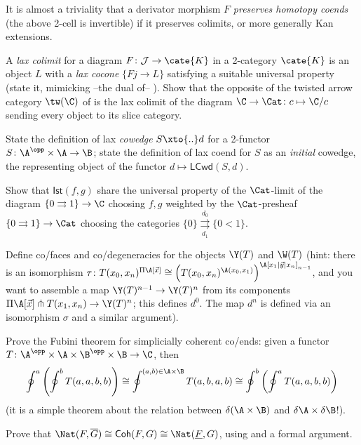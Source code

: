It is almost a triviality that a derivator morphism $F$ \emph{preserves homotopy coends} (\ie the above 2-cell is invertible) if it preserves colimits, or more generally Kan extensions.
\begin{exerciseset}
\begin{exercisepoints}
\item \label{ex8:tw-as-a-laxlim} A \emph{lax colimit} for a diagram $F \colon \mathcal{J}\to \cate{K}$ in a 2-category $\cate{K}$ is an object $L$ with a \emph{lax cocone} $\{Fj \to L\}$ satisfying a suitable universal property (state it, mimicking --the dual of-- \adef{}). Show that the opposite of the twisted arrow category $\tw(\C)$ of \adef{} is the lax colimit of the diagram $\C \to \Cat \colon c \mapsto \C/c$ sending every object to its slice category.
\item \label{ex8:laxcoends} State the definition of lax \emph{cowedge} $S\xto{..}d$ for a 2-functor $S\colon \A^\opp\times \A\to \B$; state the definition of lax coend for $S$ as an \emph{initial} cowedge, the representing object of the functor $d\mapsto \textsf{LCwd}(S,d)$. 
\item \label{ex8:inserter} Show that $\textsf{Ist}(f,g)$ share the universal property of the $\Cat$-limit of the diagram $\{0\rightrightarrows 1\} \to \C$ choosing $f,g$ weighted by the $\Cat$-presheaf $\{0\rightrightarrows 1\} \to \Cat$ choosing the categories $\{0\} \underset{d_1}{\overset{d_0}\rightrightarrows} \{0<1\}$.
\item \label{ex8:Y-of-T} Define co/faces and co/degeneracies for the objects $\Y(T)$ and $\W(T)$ (hint: there is an isomorphism $\tau \colon T(x_0,x_n)^{\Pi \A[\vec x]}\cong \Big(T(x_0,x_n)^{\A(x_0,x_1)}\Big)^{\A[x_1|\vec y|x_n]_{n-1}}$, and you want to assemble a map $\Y(T)^{n-1}\to \Y(T)^n$ from its components $\Pi \A[\vec x] \pitchfork T(x_1,x_n) \to \Y(T)^n$; this defines $d^0$. The map $d^n$ is defined via an isomorphism $\sigma$ and a similar argument).
\item \label{ex8:cohfubini} Prove the Fubini theorem for simplicially coherent co/ends: given a functor $T\colon \A^\opp\times \A\times \B^\opp\times \B\to\C$, then
\[
\oint^a\left( \oint^b T(a,a,b,b)\right)\cong
\oint^{(a,b)\in\A\times\B} T(a,b,a,b)\cong
\oint^b\left( \oint^a T(a,a,b,b)\right)
\]
(it is a simple theorem about the relation between $\delta(\A\times\B)$ and $\delta\A\times\delta\B$!).
\item \label{ex8:cohnat} Prove that $\Nat(F, \overline G) \cong \textsf{Coh}(F,G) \cong \Nat(\underline F,G)$, using \adef {} and a formal argument.

\end{exercisepoints}
\end{exerciseset}
